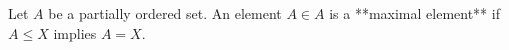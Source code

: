 Let $A$ be a partially ordered set. An element $A \in A$ is a **maximal element** if $A \leq X$ implies $A = X$.
